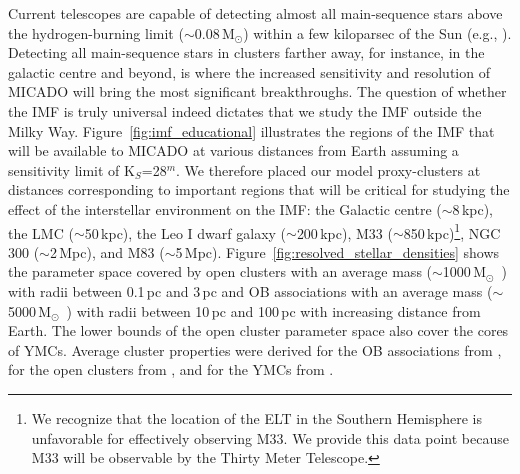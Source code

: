\documentclass[referee]{aa}
\newcommand{\msun}{M$_\odot$~}
\newcommand{\msune}{M$_\odot$}
\newcommand{\s}{$\sim$}
\begin{document}
Current telescopes are capable of detecting almost all main-sequence stars above the hydrogen-burning limit (\s0.08\,\msune) within a few kiloparsec of the Sun (e.g., \citealt{muzic17}).
Detecting all main-sequence stars in clusters farther away, for instance, in the galactic centre and beyond, is where the increased sensitivity and resolution of MICADO will bring the most significant breakthroughs.
The question of whether the IMF is truly universal indeed dictates that we study the IMF outside the Milky Way.
Figure~\ref{fig:imf_educational} illustrates the regions of the IMF that will be available to MICADO at various distances from Earth assuming a sensitivity limit of K$_S$=28$^m$.
We therefore placed our model proxy-clusters at distances corresponding to important regions that will be critical for studying the effect of the interstellar environment on the IMF: the Galactic centre (\s8\,kpc), the LMC (\s50\,kpc), the Leo I dwarf galaxy (\s200\,kpc), M33 (\s850\,kpc)\footnote{We recognize that the location of the ELT in the Southern Hemisphere is unfavorable for effectively observing M33.
We provide this data point because M33 will be observable by the Thirty Meter Telescope.}, NGC 300 (\s2\,Mpc), and M83 (\s5\,Mpc).
Figure~\ref{fig:resolved_stellar_densities} shows the parameter space covered by open clusters with an average mass (\s1000\,\msun) with radii between 0.1\,pc and 3\,pc and OB associations with an average mass (\s5000\,\msun) with radii between 10\,pc and 100\,pc with increasing distance from Earth.
The lower bounds of the open cluster parameter space also cover the cores of YMCs. Average cluster properties were derived for the OB associations from \citet{melnik1995}, for the open clusters from \citet{piskunov2007}, and for the YMCs from \citet{portegies2010}.
\end{document}

